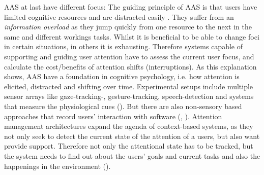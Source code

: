 \ac{AAS} at last have different focus: The guiding principle of \acs{AAS} is that users have limited cognitive resources and are distracted easily . They suffer from an \textit{information overload} as they jump quickly from one resource to the next in the same and different workings tasks. Whilst it is beneficial to be able to change foci in certain situations, in others it is exhausting. Therefore systems capable of supporting and guiding user attention have to assess the current user focus, and calculate the cost/benefits of attention shifts (interruptions). As this explanation shows, \acs{AAS} have a foundation in cognitive psychology, i.e. how attention is elicited, distracted and shifting over time. Experimental setups include multiple sensor arrays like  gaze-tracking-, gesture-tracking, speech-detection and systems that measure the physiological cues (\cite{roda2006attention}). But there are also non-sensory based approaches that record users' interaction with software (\cite{horvitz2003models}, \cite{schmitz2011contextualized}). Attention management architectures expand the agenda of context-based systems, as they not only seek to detect the current state of the attention of a users, but also want provide support. Therefore not only the attentional state has to be tracked, but the system needs to find out about the users' goals and current tasks and also the happenings in the environment (\cite{roda2006attention}). 

